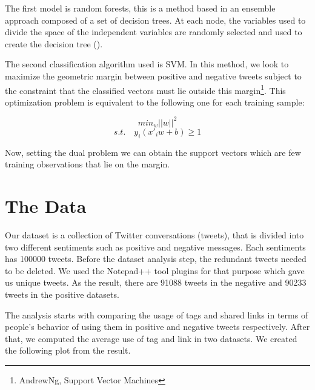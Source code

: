 \documentclass[10pt,conference,compsocconf]{IEEEtran}
\begin{document}
The first model is random forests, this is a method based in an ensemble approach composed of a set of decision trees. At each node, the variables used to divide the space of the independent variables are randomly selected and used to create the decision tree (\cite{breiman2001random}). 

The second classification algorithm used is SVM. In this method, we look to maximize the geometric margin between positive and negative tweets subject to the constraint that the classified vectors must lie outside this margin\footnote{AndrewNg, Support Vector Machines}. This optimization problem is equivalent to the following one for each training sample:

$$min_w || w ||^2$$
$$s.t. \quad y_i(x'_iw +b)\geq 1$$

 Now, setting the dual problem we can obtain the support vectors which are few training observations that lie on the margin. 
 



\section{The Data}
\label{S3}

Our dataset is a collection of Twitter conversations (tweets), that is divided into two different sentiments such as positive and negative messages. Each sentiments has 100000 tweets. Before the dataset analysis step, the redundant tweets needed to be deleted. We used the Notepad++ tool plugins for that purpose which gave us unique tweets. As the result, there are 91088 tweets in the negative and 90233 tweets in the positive datasets.
 
The analysis starts with comparing the usage of tags and shared links in terms of people's behavior of using them in positive and negative tweets respectively. After that, we computed the average use of tag and link in two datasets. We created the following plot from the result.
\end{document}
